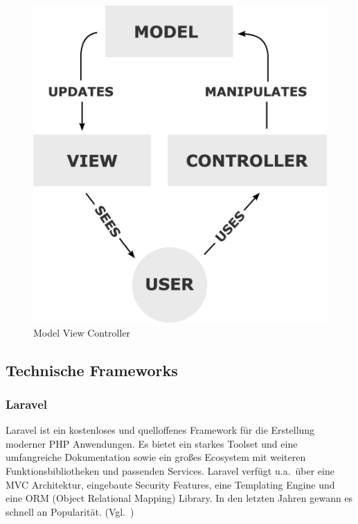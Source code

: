 \begin{figure}[h!]
    \centering
    \caption{Model View Controller}
    \label{fig:mvc}
    \includegraphics[scale=0.15]{assets/wikipedia_mvc_process}
\end{figure}

\newpage

\subsection{Technische Frameworks}

\subsubsection{Laravel}
Laravel ist ein kostenloses und quelloffenes Framework für die Erstellung moderner PHP Anwendungen.
Es bietet ein starkes Toolset und eine umfangreiche Dokumentation sowie ein großes Ecosystem mit weiteren Funktionsbibliotheken und passenden Services.
Laravel verfügt u.a.\ über eine MVC Architektur, eingebaute Security Features, eine Templating Engine und eine ORM (Object Relational Mapping) Library.
In den letzten Jahren gewann es schnell an Popularität.
(Vgl.~\cite{what-is-laravel})

